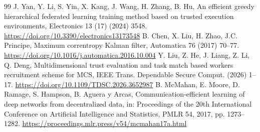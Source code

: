\documentclass[final,5p,times,twocolumn]{elsarticle/elsarticle}
\begin{document}
\begin{thebibliography}{99}
     J. Yan, Y. Li, S. Yin, X. Kang, J. Wang, H. Zhang, B. Hu, An efficient greedy hierarchical federated learning training method based on trusted execution environments, Electronics 13 (17) (2024) 3548. \url{https://doi.org/10.3390/electronics13173548}
     B. Chen, X. Liu, H. Zhao, J.C. Principe, Maximum correntropy Kalman filter, Automatica 76 (2017) 70--77. \url{https://doi.org/10.1016/j.automatica.2016.10.004}
     Y. Liu, Z. He, J. Liang, Z. Li, Q. Deng, Multidimensional trust evaluation and task match based workers recruitment scheme for MCS, IEEE Trans. Dependable Secure Comput. (2026) 1--17. \url{https://doi.org/10.1109/TDSC.2026.3652987}
     B. McMahan, E. Moore, D. Ramage, S. Hampson, B. Aguera y Arcas, Communication-efficient learning of deep networks from decentralized data, in: Proceedings of the 20th International Conference on Artificial Intelligence and Statistics, PMLR 54, 2017, pp. 1273--1282. \url{https://proceedings.mlr.press/v54/mcmahan17a.html}

\end{thebibliography}
\end{document}
